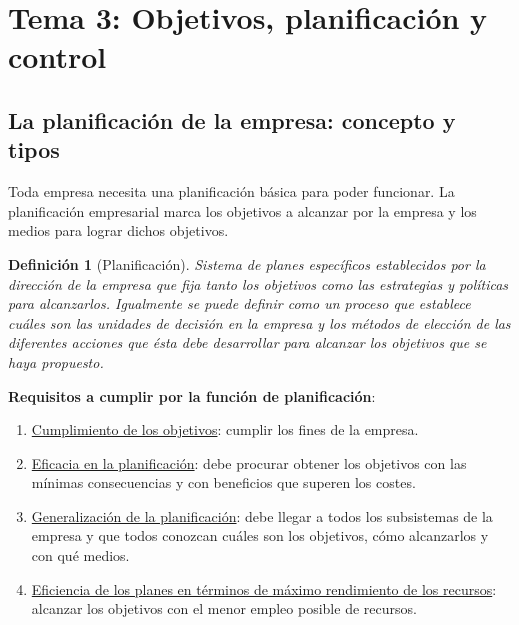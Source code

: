 \documentclass[12pt]{article}
\theoremstyle{definition_wo_parentheses}
\newtheorem{definicion}{Definición}[section]
\begin{document}
\section{Tema 3: Objetivos, planificación y control}
\subsection{La planificación de la empresa: concepto y tipos}
Toda empresa necesita una planificación básica para poder funcionar. La planificación empresarial marca los objetivos a alcanzar por la empresa y los medios para lograr dichos objetivos.
\begin{definicion}[Planificación]
Sistema de planes específicos establecidos por la dirección de la empresa que fija tanto los objetivos como las estrategias y políticas para alcanzarlos. Igualmente se puede definir como un proceso que establece cuáles son las unidades de decisión en la empresa y los métodos de elección de las diferentes acciones que ésta debe desarrollar para alcanzar los objetivos que se haya propuesto.
\end{definicion}

\textbf{Requisitos a cumplir por la función de planificación}:
\begin{enumerate}
\item \underline{Cumplimiento de los objetivos}: cumplir los fines de la empresa.
\item \underline{Eficacia en la planificación}: debe procurar obtener los objetivos con las mínimas consecuencias y con beneficios que superen los costes.
\item \underline{Generalización de la planificación}: debe llegar a todos los subsistemas de la empresa y que todos conozcan cuáles son los objetivos, cómo alcanzarlos y con qué medios.
\item \underline{Eficiencia de los planes en términos de máximo rendimiento de los recursos}: alcanzar los objetivos con el menor empleo posible de recursos.
\end{enumerate}
\end{document}
